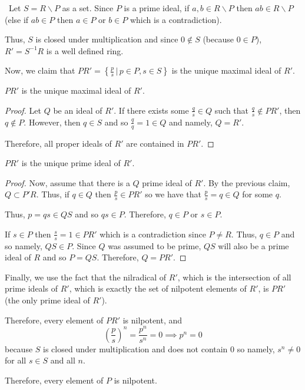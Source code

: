 \documentclass[12pt]{Qual}
\begin{document}
\begin{solution}$\,$
Let $S=R\backslash P$ as a set. Since $P$ is a prime ideal, if $a, b\in R\backslash P$ then $ab\in R\backslash P$ (else if $ab\in P$ then $a\in P$ or $b\in P$ which is a contradiction).

Thus, $S$ is closed under multiplication and since $0\notin S$ (because $0\in P$), $R'=S^{-1}R$ is a well defined ring.

Now, we claim that $PR'=\left\{\frac{p}{s}\,|\, p\in P,s\in S\right\}$ is the unique maximal ideal of $R'$.

\begin{claim} $PR'$ is the unique maximal ideal of $R'.$
\begin{proof} Let $Q$ be an ideal of $R'$. If there exists some $\frac{q}{s}\in Q$ such that $\frac{q}{s}\notin PR'$, then $q\notin P$. However, then $q\in S$ and so $\frac{q}{q}=1\in Q$ and namely, $Q=R'$.

Therefore, all proper ideals of $R'$ are contained in $PR'.$
\end{proof}
\end{claim}

\begin{claim} $PR'$ is the unique prime ideal of $R'.$
\begin{proof} Now, assume that there is a $Q$ prime ideal of $R'$. By the previous claim, $Q\subset P'R.$ Thus, if $q\in Q$ then $\frac{p}{s}\in PR'$ so we have that $\frac{p}{s}=q\in Q$ for some $q$.

Thus, $p=qs\in QS$ and so $qs\in P$. Therefore, $q\in P$ or $s\in P.$

If $s\in P$ then $\frac{s}{s}=1\in PR'$ which is a contradiction since $P\not=R$. Thus, $q\in P$ and so namely, $QS\in P$. Since $Q$ was assumed to be prime, $QS$ will also be a prime ideal of $R$ and so $P=QS$. Therefore, $Q=PR'.$
\end{proof}
\end{claim}

Finally, we use the fact that the nilradical of $R'$, which is the intersection of all prime ideals of $R'$, which is exactly the set of nilpotent elements of $R'$, is $PR'$ (the only prime ideal of $R'$).

Therefore, every element of $PR'$ is nilpotent, and $$\left(\frac{p}{s}\right)^n=\frac{p^n}{s^n}=0\implies p^n=0$$ because $S$ is closed under multiplication and does not contain $0$ so namely, $s^n\not=0$ for all $s\in S$ and all $n.$

Therefore, every element of $P$ is nilpotent.
\end{solution}
\newpage
\end{document}
